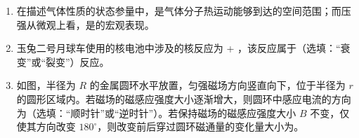 \documentclass[\gkver]{gaokaozhenti}
\begin{document}
\begin{enumerate}
{由 $F_{\text{安}}=\frac{B^{2}l^{2}v}{R}=ma$ 可知，进磁场过程中的平均安培力较大，进磁场和出磁场过程的位移相等，由 $W=Fs$ 可知 $W_{1} > W_{2}$。

线框在进、出磁场过程中都做加速度减小的减速运动，可以画出对应的 $v-t$ 图像，在位移相等的情况下，根据图像可得出 $t_{1} < t_{2}$ 的结论。

\onepicture[w=5.5cm]{}

正确选项为 B。
}

\item
在描述气体性质的状态参量中，是气体分子热运动能够到达的空间范围；而压强从微观上看，是的宏观表现。

\item
玉兔二号月球车使用的核电池中涉及的核反应为  + ，该反应属于（选填：“衰变”或“裂变”）反应。

\item
如图，半径为 $R$ 的金属圆环水平放置，匀强磁场方向竖直向下，位于半径为 $r$ 的圆形区域内。若磁场的磁感应强度大小逐渐增大，则圆环中感应电流的方向为（选填：“顺时针”或“逆时针”）。若保持磁场的磁感应强度大小 $B$ 不变，仅使其方向改变 $180^{\circ}$，则改变前后穿过圆环磁通量的变化量大小为。
\onepicture[w=3cm, align=right]{}
\end{enumerate}
\end{document}
